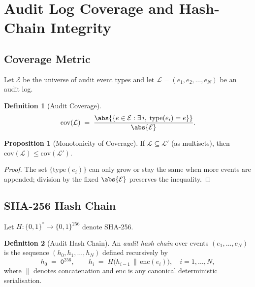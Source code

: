 \documentclass[12pt,letterpaper]{article}
\theoremstyle{definition}
\newtheorem{definition}{Definition}[section]
\newtheorem{proposition}{Proposition}[section]
\theoremstyle{remark}
\begin{document}
\section{Audit Log Coverage and Hash-Chain Integrity}
\label{sec:audit}

\subsection{Coverage Metric}
\label{ssec:coverage}

Let \(\mathcal{E}\) be the universe of audit event types and let
\(\mathcal{L} = (e_1, e_2, \ldots, e_N)\) be an audit log.

\begin{definition}[Audit Coverage]
  \label{def:coverage}
  \[
    \mathrm{cov}(\mathcal{L})
    \;=\; \frac{\abs{\{e \in \mathcal{E} : \exists\, i,\; \text{type}(e_i)=e\}}}
               {\abs{\mathcal{E}}}.
  \]
\end{definition}

\begin{proposition}[Monotonicity of Coverage]
  \label{prop:cov-mono}
  If \(\mathcal{L} \subseteq \mathcal{L}'\) (as multisets), then
  \(\mathrm{cov}(\mathcal{L}) \le \mathrm{cov}(\mathcal{L}')\).
\end{proposition}

\begin{proof}
  The set \(\{\text{type}(e_i)\}\) can only grow or stay the same when more
  events are appended; division by the fixed \(\abs{\mathcal{E}}\) preserves
  the inequality.
\end{proof}

\subsection{SHA-256 Hash Chain}
\label{ssec:hashchain}

Let \(H : \{0,1\}^* \to \{0,1\}^{256}\) denote SHA-256.

\begin{definition}[Audit Hash Chain]
  \label{def:hash-chain}
  An \emph{audit hash chain} over events
  \((e_1, \ldots, e_N)\) is the sequence \((h_0, h_1, \ldots, h_N)\)
  defined recursively by
  \[
    h_0 \;=\; \mathtt{0}^{256},
    \qquad
    h_i \;=\; H\bigl(h_{i-1} \,\|\, \mathrm{enc}(e_i)\bigr),
    \quad i = 1, \ldots, N,
  \]
  where \(\|\) denotes concatenation and \(\mathrm{enc}\) is any canonical
  deterministic serialisation.
\end{definition}
\end{document}

